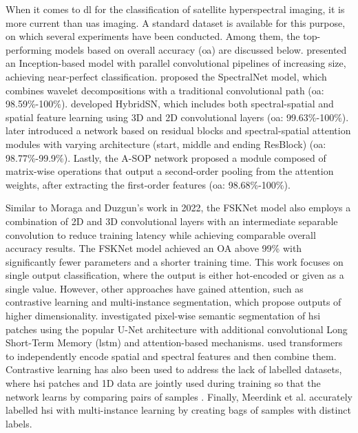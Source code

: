 When it comes to \acrshort{dl} for the classification of satellite hyperspectral imaging, it is more current than \acrshort{uas} imaging. A standard dataset is available for this purpose, on which several experiments have been conducted. Among them, the top-performing models based on overall accuracy (\acrshort{oa}) are discussed below. \cite{moraga_jigsawhsi_2022} presented an Inception-based model with parallel convolutional pipelines of increasing size, achieving near-perfect classification. \cite{chakraborty_spectralnet_2021} proposed the SpectralNet model, which combines wavelet decompositions with a traditional convolutional path (\acrshort{oa}: 98.59\%-100\%). \cite{roy_hybridsn_2020} developed HybridSN, which includes both spectral-spatial and spatial feature learning using 3D and 2D convolutional layers (\acrshort{oa}: 99.63\%-100\%). \cite{roy_attention-based_2021} later introduced a network based on residual blocks and spectral-spatial attention modules with varying architecture (start, middle and ending ResBlock) (\acrshort{oa}: 98.77\%-99.9\%). Lastly, the A-SOP network \cite{xue_attention-based_2021} proposed a module composed of matrix-wise operations that output a second-order pooling from the attention weights, after extracting the first-order features (\acrshort{oa}: 98.68\%-100\%). 

Similar to Moraga and Duzgun's work in 2022, the FSKNet model also employs a combination of 2D and 3D convolutional layers with an intermediate separable convolution to reduce training latency while achieving comparable overall accuracy results. The FSKNet model achieved an OA above 99\% with significantly fewer parameters and a shorter training time. This work focuses on single output classification, where the output is either hot-encoded or given as a single value. However, other approaches have gained attention, such as contrastive learning and multi-instance segmentation, which propose outputs of higher dimensionality. \cite{zhu_spectral-spatial-dependent_2021} investigated pixel-wise semantic segmentation of \acrshort{hsi} patches using the popular U-Net architecture with additional convolutional Long Short-Term Memory (\acrshort{lstm}) and attention-based mechanisms. \cite{xin_convolution_2022} used transformers to independently encode spatial and spectral features and then combine them. Contrastive learning has also been used to address the lack of labelled datasets, where \acrshort{hsi} patches and 1D data are jointly used during training so that the network learns by comparing pairs of samples \cite{guan_spatial-spectral_2022}. Finally, Meerdink et al. \cite{meerdink_multitarget_2022} accurately labelled \acrshort{hsi} with multi-instance learning by creating bags of samples with distinct labels.

